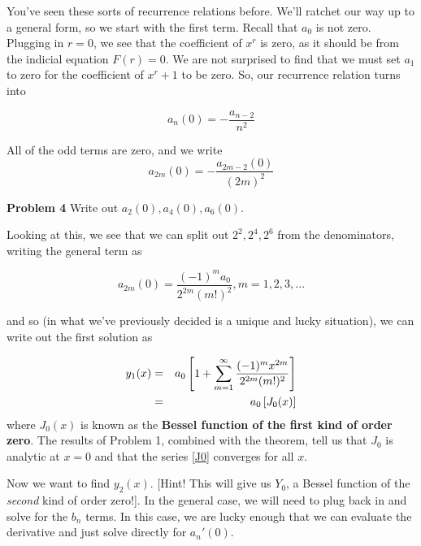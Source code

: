 \documentclass[12pt]{article}
\begin{document}
You've seen these sorts of recurrence relations before. We'll ratchet
our way up to a general form, so we start with the first term. Recall
that $a_0$ is not zero.  Plugging in $r=0$, we see that the
coefficient of $x^r$ is zero, as it should be from the indicial
equation $F(r) = 0$. We are not surprised to find that we must set
$a_1$ to zero for the coefficient of $x^r+1$ to be zero. So, our
recurrence relation turns into

\begin{equation*}
  a_n(0) = -\frac{a_{n-2}}{n^2}
\end{equation*}

All of the odd terms are zero, and we write
\begin{equation*}
  a_{2m}(0) = -\frac{a_{2m-2}(0)}{(2m)^2}
\end{equation*}

\textbf{Problem 4} Write out $a_2(0), a_4(0), a_6(0)$.
\vskip2in

Looking at this, we see that we can split out $2^2, 2^4,2^6$ from the denominators, writing the general term as

\begin{equation*}
  a_{2m}(0) = \frac{(-1)^ma_0}{2^{2m}(m!)^2}, m=1,2,3,...
\end{equation*}

and so (in what we've previously decided is a unique and lucky situation), we can write out the first solution as

\begin{eqnarray}
  y_1(x) &=& a_0\left [ 1 + \sum_{m=1}^{\infty} \frac{(-1)^mx^{2m}}{2^{2m}(m!)^2}\right ] \notag\\
  \label{J0}
         &=& a_0\left [J_0(x) \right ]
\end{eqnarray}
where $J_0(x)$ is known as the \textbf{Bessel function of the first kind of order zero}. The results of Problem 1, combined with the theorem, tell us that $J_0$ is analytic at $x=0$ and that the series \eqref{J0} converges for all $x$.

Now we want to find $y_2(x)$. [Hint! This will give us $Y_0$, a Bessel function of the \textit{second} kind of order zero!]. In the general case, we will need to plug back in and solve for the $b_n$ terms. In this case, we are lucky enough that we can evaluate the derivative and just solve directly for $a_n{'}(0)$.
\end{document}
